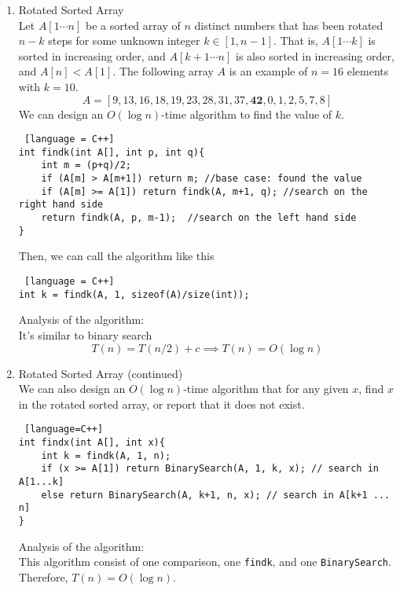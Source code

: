 \documentclass[11pt]{article}
\begin{document}
\begin{enumerate}
\item Rotated Sorted Array\\
Let $A[1 \cdots n]$ be a sorted array of $n$ distinct numbers that has been rotated $n-k$ steps for some unknown integer $k \in [1, n-1]$. That is, $A[1 \cdots k]$ is sorted in increasing order, and $A[k+1 \cdots n]$ is also sorted in increasing order, and $A[n] < A[1]$. The following array $A$ is an example of $n=16$ elements with $k=10$. $$A=[9, 13, 16, 18, 19, 23, 28, 31, 37, \mathbf{42}, 0, 1, 2, 5, 7, 8]$$ We can design an $O(\log n)$-time algorithm to find the value of $k$.
\begin{lstlisting} [language = C++]
int findk(int A[], int p, int q){
	int m = (p+q)/2;
	if (A[m] > A[m+1]) return m; //base case: found the value
	if (A[m] >= A[1]) return findk(A, m+1, q); //search on the right hand side
	return findk(A, p, m-1);  //search on the left hand side
}
\end{lstlisting}
Then, we can call the algorithm like this
\begin{lstlisting} [language = C++]
int k = findk(A, 1, sizeof(A)/size(int));
\end{lstlisting}
Analysis of the algorithm:\\
It's similar to binary search $$T(n) = T(n/2) + c \implies T(n) = O(\log n)$$

\item Rotated Sorted Array (continued)\\
We can also design an $O(\log n)$-time algorithm that for any given $x$, find $x$ in the rotated sorted array, or report that it does not exist.
\begin{lstlisting} [language=C++]
int findx(int A[], int x){
	int k = findk(A, 1, n);
	if (x >= A[1]) return BinarySearch(A, 1, k, x); // search in  A[1...k]
	else return BinarySearch(A, k+1, n, x); // search in A[k+1 ... n]
}
\end{lstlisting}
Analysis of the algorithm:\\
This algorithm consist of one comparison, one \texttt{findk}, and one \texttt{BinarySearch}. Therefore, $T(n) = O(\log n)$.


\end{enumerate}
\end{document}
